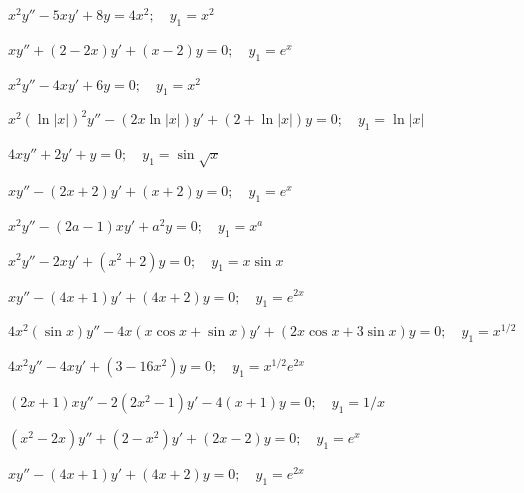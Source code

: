 \begin{exerciselist}
  \item\label{exer:5.6.17} $x^{2}y''-5xy'+8y=4x^{2};\quad y_{1}=x^{2}$


  \item\label{exer:5.6.18} $xy''+(2-2x)y'+(x-2)y=0;\quad y_{1}=e^{x}$

  \item\label{exer:5.6.19} $x^{2}y''-4xy'+6y=0;\quad y_{1}=x^{2}$

  \item\label{exer:5.6.20} $x^{2}(\ln|x|)^{2}y''-(2x\ln|x|)y'+(2+\ln|x|)y=0;\quad y_{1}=\ln|x|$

  \item\label{exer:5.6.21} $4xy''+2y'+y=0;\quad y_{1}=\sin\sqrt{x}$

  \item\label{exer:5.6.22} $xy''-(2x+2)y'+(x+2)y=0;\quad y_{1}=e^{x}$

  \item\label{exer:5.6.23} $x^{2}y''-(2a-1)xy'+a^{2}y=0;\quad y_{1}=x^{a}$

  \item\label{exer:5.6.24} $x^{2}y''-2xy'+(x^{2}+2)y=0;\quad y_{1}=x\sin x$

  \item\label{exer:5.6.25} $xy''-(4x+1)y'+(4x+2)y=0;\quad y_{1}=e^{2x}$

  \item\label{exer:5.6.26}
        $4x^{2}(\sin x)y''-4x(x\cos x+\sin x)y'+(2x\cos x+3\sin x)y=0;\quad y_{1}=x^{1/2}$

  \item\label{exer:5.6.27} $4x^{2}y''-4xy'+(3-16x^{2})y=0;\quad y_{1}=x^{1/2}e^{2x}$

  \item\label{exer:5.6.28} $(2x+1)xy''-2(2x^{2}-1)y'-4(x+1)y=0;\quad y_{1}=1/x$

  \item\label{exer:5.6.29} $(x^{2}-2x)y''+(2-x^{2})y'+(2x-2)y=0;\quad y_{1}=e^{x}$

  \item\label{exer:5.6.30} $xy''-(4x+1)y'+(4x+2)y=0;\quad y_{1}=e^{2x}$



\end{exerciselist}
